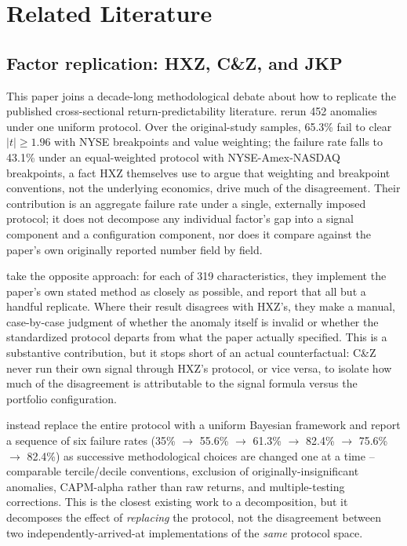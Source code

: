 \section{Related Literature}
\label{sec:related}

\subsection{Factor replication: HXZ, C\&Z, and JKP}

This paper joins a decade-long methodological debate about how to replicate
the published cross-sectional return-predictability literature. \citet{HouXueZhang2020}
rerun 452 anomalies under one uniform protocol. Over the original-study
samples, 65.3\% fail to clear $|t|\geq 1.96$ with NYSE breakpoints and value
weighting; the failure rate falls to 43.1\% under an equal-weighted protocol
with NYSE-Amex-NASDAQ breakpoints, a fact HXZ themselves use to
argue that weighting and breakpoint conventions, not the underlying
economics, drive much of the disagreement. Their contribution is an
aggregate failure rate under a single, externally imposed protocol; it does
not decompose any individual factor's gap into a signal component and a
configuration component, nor does it compare against the paper's own
originally reported number field by field.

\citet{ChenZimmermann2022} take the opposite approach: for each of 319
characteristics, they implement the paper's own stated method as closely as
possible, and report that all but a handful replicate. Where their result
disagrees with HXZ's, they make a manual, case-by-case judgment of whether
the anomaly itself is invalid or whether the standardized protocol departs
from what the paper actually specified. This is a substantive contribution,
but it stops short of an actual counterfactual: C\&Z never run their own
signal through HXZ's protocol, or vice versa, to isolate how much of the
disagreement is attributable to the signal formula versus the portfolio
configuration.

\citet{JensenKellyPedersen2023} instead replace the entire protocol with
a uniform Bayesian framework and report a sequence of six failure rates
(35\% $\to$ 55.6\% $\to$ 61.3\% $\to$ 82.4\% $\to$ 75.6\% $\to$ 82.4\%) as
successive methodological choices are changed one at a time -- comparable
tercile/decile conventions, exclusion of originally-insignificant anomalies,
CAPM-alpha rather than raw returns, and multiple-testing corrections. This
is the closest existing work to a decomposition, but it decomposes the
effect of \emph{replacing} the protocol, not the disagreement between two
independently-arrived-at implementations of the \emph{same} protocol space.

